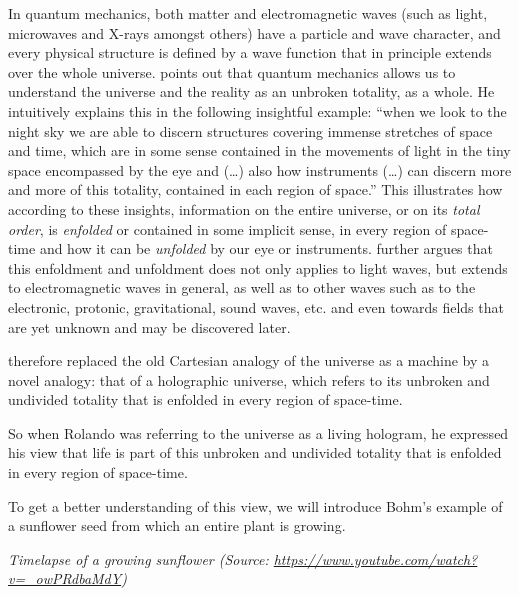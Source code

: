 \documentclass[
  11pt,
]{book}
\begin{document}
In quantum mechanics, both matter and electromagnetic waves (such as light, microwaves and X-rays amongst others) have a particle and wave character, and every physical structure is defined by a wave function that in principle extends over the whole universe. \citet{bohm1980} points out that quantum mechanics allows us to understand the universe and the reality as an unbroken totality, as a whole. He intuitively explains this in the following insightful example: ``when we look to the night sky we are able to discern structures covering immense stretches of space and time, which are in some sense contained in the movements of light in the tiny space encompassed by the eye and (\ldots) also how instruments (\ldots) can discern more and more of this totality, contained in each region of space.'' This illustrates how according to these insights, information on the entire universe, or on its \emph{total order}, is \emph{enfolded} or contained in some implicit sense, in every region of space-time and how it can be \emph{unfolded} by our eye or instruments. \citet{bohm1980} further argues that this enfoldment and unfoldment does not only applies to light waves, but extends to electromagnetic waves in general, as well as to other waves such as to the electronic, protonic, gravitational, sound waves, etc. and even towards fields that are yet unknown and may be discovered later.

\citet{bohm1980} therefore replaced the old Cartesian analogy of the universe as a machine by a novel analogy: that of a holographic universe, which refers to its unbroken and undivided totality that is enfolded in every region of space-time.

So when Rolando was referring to the universe as a living hologram, he expressed his view that life is part of this unbroken and undivided totality that is enfolded in every region of space-time.

To get a better understanding of this view, we will introduce Bohm's example of a sunflower seed from which an entire plant is growing.

\emph{Timelapse of a growing sunflower (Source: \url{https://www.youtube.com/watch?v=_owPRdbaMdY})}
\end{document}
